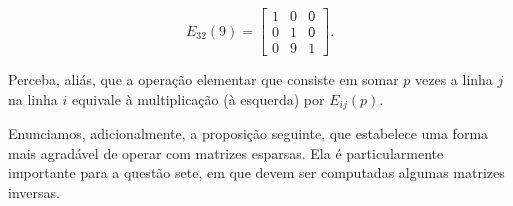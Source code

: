 \documentclass[leqno]{article}
\begin{document}
\begin{equation*} 
	E_{32}(9) = \begin{bmatrix} 1 & 0 & 0 \\ 0 & 1 & 0 \\ 0 & 9 & 1 \end{bmatrix}. 
\end{equation*} 

\noindent Perceba, aliás, que a operação elementar que consiste em somar $p$ vezes a linha $j$ na linha $i$ equivale à multiplicação (à esquerda) por $E_{ij}(p)$. 

Enunciamos, adicionalmente, a proposição seguinte, que estabelece uma forma mais agradável de operar com matrizes esparsas. Ela é particularmente importante para a questão sete, em que devem ser computadas algumas matrizes inversas.  
\end{document}
